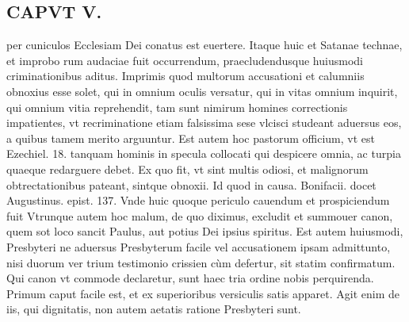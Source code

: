 \documentclass{article}
\begin{document}
\begin{pages}
\section*{CAPVT  V. }
\marginpar{[ p.333 ]}\pstart per cuniculos Ecclesiam Dei conatus est euertere. Itaque huic et Satanae technae, et improbo rum audaciae fuit occurrendum, praecludendusque  huiusmodi criminationibus aditus. Imprimis quod multorum accusationi et calumniis obnoxius esse solet, qui in omnium oculis versatur, qui in vitas omnium inquirit, qui omnium vitia reprehendit, tam sunt nimirum homines correctionis impatientes, vt recriminatione etiam falsissima sese vlcisci studeant aduersus eos, a quibus tamem merito arguuntur. Est autem hoc pastorum officium, vt est Ezechiel. 18. tanquam hominis in specula collocati qui despicere omnia, ac turpia quaeque  redarguere debet. Ex quo fit, vt sint multis odiosi, et malignorum obtrectationibus pateant, sintque obnoxii. Id quod in causa. Bonifacii. docet Augustinus. epist. 137. Vnde huic quoque periculo cauendum et prospiciendum fuit Vtrunque  autem hoc malum, de quo diximus, excludit et summouer canon, quem sot loco sancit Paulus, aut potius Dei ipsius spiritus. Est autem huiusmodi, Presbyteri ne aduersus Presbyterum facile vel accusationem ipsam admittunto, nisi duorum ver trium testimonio crissien cùm defertur, sit statim confirmatum.  \pend\pstart Qui canon vt commode declaretur, sunt haec tria ordine nobis perquirenda.  \pend\pstart Primum caput facile est, et ex superioribus versiculis satis apparet. Agit enim de iis, qui dignitatis, non autem aetatis ratione Presbyteri sunt.  \pend

\end{pages}
\end{document}
